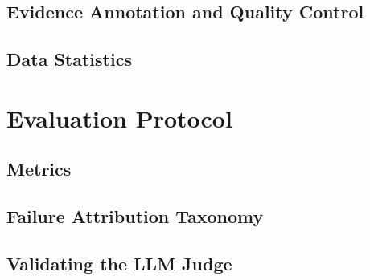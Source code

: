 \documentclass[10pt]{article}
\begin{document}
\subsection{Evidence Annotation and Quality Control}
\subsection{Data Statistics}

\section{Evaluation Protocol}
\subsection{Metrics}
\subsection{Failure Attribution Taxonomy}
\subsection{Validating the LLM Judge}
\end{document}
